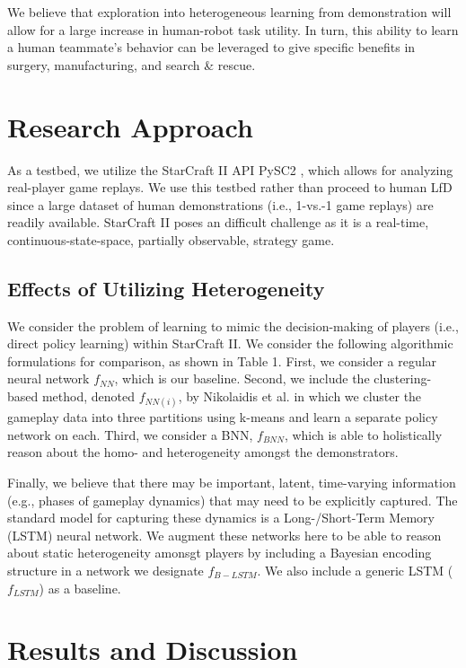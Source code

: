 \documentclass[conference]{IEEEtran}
\begin{document}
We believe that exploration into heterogeneous learning from demonstration will allow for a large increase in human-robot task utility. In turn, this ability to learn a human teammate's behavior can be leveraged to give specific benefits in surgery, manufacturing, and search \& rescue. 

\section{Research Approach}
\par As a testbed, we utilize the StarCraft II API PySC2 \cite{vinyals2017starcraft}, which allows for analyzing real-player game replays. We use this testbed rather than proceed to human LfD since a large dataset of human demonstrations (i.e., 1-vs.-1 game replays) are readily available. StarCraft II poses an difficult challenge as it is a real-time, continuous-state-space, partially observable, strategy game. 

\subsection{Effects of Utilizing Heterogeneity}
\par We consider the problem of learning to mimic the decision-making of players (i.e., direct policy learning) within StarCraft II. We consider the following algorithmic formulations for comparison, as shown in Table 1. First, we consider a regular neural network $f_{NN}$, which is our baseline. Second, we include the clustering-based method, denoted $f_{NN(i)}$, by Nikolaidis et al. \cite{Nikolaidis:2015:EML:2696454.2696455} in which we cluster the gameplay data into three partitions using k-means and learn a separate policy network on each. Third, we consider a BNN, $f_{BNN}$, which is able to holistically reason about the homo- and heterogeneity amongst the demonstrators. 

\par Finally, we believe that there may be important, latent, time-varying information (e.g., phases of gameplay dynamics) that may need to be explicitly captured. The standard model for capturing these dynamics is a Long-/Short-Term Memory (LSTM) neural network. We augment these networks here to be able to reason about static heterogeneity amonsgt players by including a Bayesian encoding structure in a network we designate $f_{B-LSTM}$. We also include a generic LSTM ($f_{LSTM}$) as a baseline.

\section{Results and Discussion}\label{AA}
\end{document}
